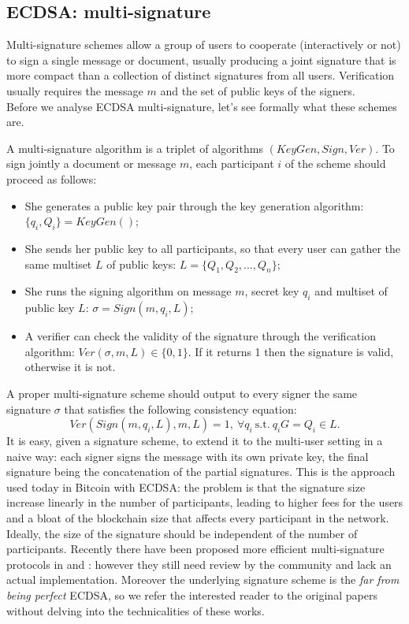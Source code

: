 \bigskip

\subsection{ECDSA: multi-signature}
Multi-signature schemes allow a group of users to cooperate (interactively or not) to sign a single message or document, usually producing a joint signature that is more compact than a collection of distinct signatures from all users. Verification usually requires the message $m$ and the set of public keys of the signers.
\\
Before we analyse ECDSA multi-signature, let's see formally what these schemes are.

\bigskip
\noindent
A multi-signature algorithm is a triplet of algorithms $(KeyGen, Sign, Ver)$. To sign jointly a document or message $m$, each participant $i$ of the scheme should proceed as follows:
\begin{itemize}
	\item She generates a public key pair through the key generation algorithm: $\{q_i, Q_i\} = KeyGen()$;
	\item She sends her public key to all participants, so that every user can gather the same multiset $L$ of public keys: $L = \{Q_1, Q_2, ..., Q_n\}$;
	\item She runs the signing algorithm on message $m$, secret key $q_i$ and multiset of public key $L$: $\sigma = Sign(m, q_i, L)$;
	\item A verifier can check the validity of the signature through the verification algorithm: $Ver(\sigma, m, L) \in \{0, 1\}$. If it returns 1 then the signature is valid, otherwise it is not.
\end{itemize}
A proper multi-signature scheme should output to every signer the same signature $\sigma$ that satisfies the following consistency equation: 
$$Ver(Sign(m, q_i, L), m, L) = 1, \ \forall q_i \ \text{s.t.} \ q_iG = Q_i \in L.$$
It is easy, given a signature scheme, to extend it to the multi-user setting in a naive way: each signer signs the message with its own private key, the final signature being the concatenation of the partial signatures. This is the approach used today in Bitcoin with ECDSA: the problem is that the signature size increase linearly in the number of participants, leading to higher fees for the users and a bloat of the blockchain size that affects every participant in the network. Ideally, the size of the signature should be independent of the number of participants. Recently there have been proposed more efficient multi-signature protocols in \cite{ECDSA1} and \cite{ECDSA2}: however they still need review by the community and lack an actual implementation. Moreover the underlying signature scheme is the \textit{far from being perfect} ECDSA, so we refer the interested reader to the original papers without delving into the technicalities of these works.

